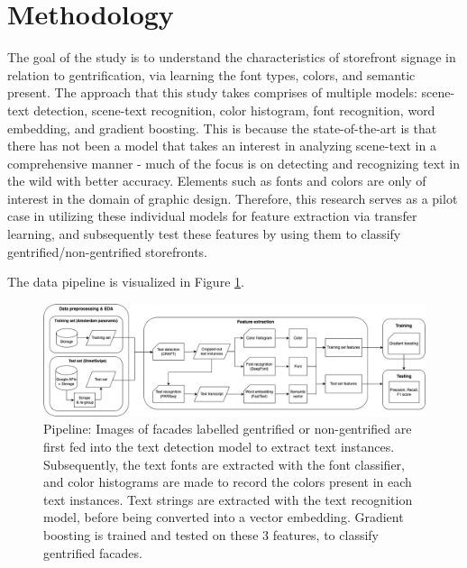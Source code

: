 \section{Methodology}
\label{sec:methodology}

The goal of the study is to understand the characteristics of storefront signage in relation to gentrification, via learning the font types, colors, and semantic present. The approach that this study takes comprises of multiple models: scene-text detection, scene-text recognition, color histogram, font recognition, word embedding, and gradient boosting. This is because the state-of-the-art is that there has not been a model that takes an interest in analyzing scene-text in a comprehensive manner - much of the focus is on detecting and recognizing text in the wild with better accuracy. Elements such as fonts and colors are only of interest in the domain of graphic design. Therefore, this research serves as a pilot case in utilizing these individual models for feature extraction via transfer learning, and subsequently test these features by using them to classify gentrified/non-gentrified storefronts.

The data pipeline is visualized in Figure \ref{fig:pipeline}.

\begin{figure}[]
    \centering
    \includegraphics[width=\textwidth]{media/methodology/Pipeline.jpg}
    \caption{Pipeline: Images of facades labelled gentrified or non-gentrified are first fed into the text detection model to extract text instances. Subsequently, the text fonts are extracted with the font classifier, and color histograms are made to record the colors present in each text instances. Text strings are extracted with the text recognition model, before being converted into a vector embedding. Gradient boosting is trained and tested on these 3 features, to classify gentrified facades.}
    \label{fig:pipeline}
\end{figure}

